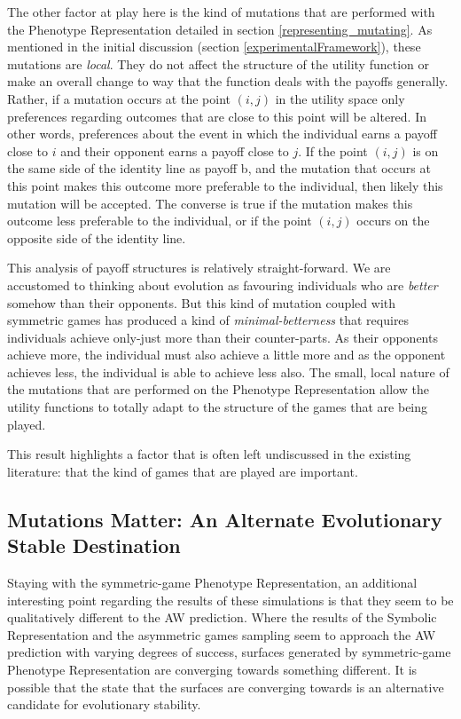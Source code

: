 \documentclass[11pt]{book}
\newcommand*{\np}{\par\noindent\newline}
\begin{document}
\np The other factor at play here is the kind of mutations that are performed with the Phenotype Representation detailed in section \ref{representing_mutating}.
As mentioned in the initial discussion (section \ref{experimentalFramework}), these mutations are \textit{local}.
They do not affect the structure of the utility function or make an overall change to way that the function deals with the payoffs generally.
Rather, if a mutation occurs at the point $(i, j)$ in the utility space only preferences regarding outcomes that are close to this point will be altered.
In other words, preferences about the event in which the individual earns a payoff close to $i$ and their opponent earns a payoff close to $j$.
If the point $(i, j)$ is on the same side of the identity line as payoff b, and the mutation that occurs at this point makes this outcome more preferable to the individual, then likely this mutation will be accepted.
The converse is true if the mutation makes this outcome less preferable to the individual, or if the point $(i, j)$ occurs on the opposite side of the identity line.

\np This analysis of payoff structures is relatively straight-forward.
We are accustomed to thinking about evolution as favouring individuals who are \textit{better} somehow than their opponents. 
But this kind of mutation coupled with symmetric games has produced a kind of \textit{minimal-betterness} that requires individuals achieve only-just more than their counter-parts.
As their opponents achieve more, the individual must also achieve a little more and as the opponent achieves less, the individual is able to achieve less also.
The small, local nature of the mutations that are performed on the Phenotype Representation allow the utility functions to totally adapt to the structure of the games that are being played.

\np This result highlights a factor that is often left undiscussed in the existing literature: that the kind of games that are played are important. 

\subsection[Mutations Matter]{Mutations Matter: An Alternate Evolutionary Stable Destination}
Staying with the symmetric-game Phenotype Representation, an additional interesting point regarding the results of these simulations is that they seem to be qualitatively different to the AW prediction.
Where the results of the Symbolic Representation and the asymmetric games sampling seem to approach the AW prediction with varying degrees of success, surfaces generated by symmetric-game Phenotype Representation are converging towards something different.
It is possible that the state that the surfaces are converging towards is an alternative candidate for evolutionary stability.
\end{document}
